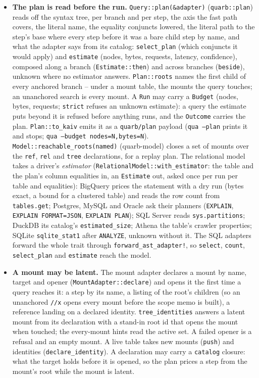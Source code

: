 \documentclass{report}
\begin{document}
\begin{itemize}
\item \textbf{The plan is read before the run.}
  \texttt{Query::plan(\&adapter)} (\texttt{quarb::plan}) reads
  off the syntax tree, per branch and per step, the axis the fast
  path covers, the literal name, the equality conjuncts lowered,
  the literal path to the step's base where every step before it
  was a bare child step by name, and what the adapter says from its
  catalog: \texttt{select\_plan} (which conjuncts it would apply)
  and \texttt{estimate} (nodes, bytes, requests, latency,
  confidence), composed along a branch (\texttt{Estimate::then})
  and across branches (\texttt{beside}), unknown where no
  estimator answers. \texttt{Plan::roots} names the first child of
  every anchored branch -- under a mount table, the mounts the
  query touches; an unanchored search is every mount. A
  \texttt{Run} may carry a \texttt{Budget} (nodes, bytes,
  requests; \texttt{strict} refuses an unknown estimate): a query
  the estimate puts beyond it is refused before anything runs, and
  the \texttt{Outcome} carries the plan. \texttt{Plan::to\_kaiv}
  emits it as a \texttt{quarb/plan} payload (\texttt{qua --plan}
  prints it and stops; \texttt{qua --budget nodes=N,bytes=N}).
  \texttt{Model::reachable\_roots(named)} (quarb-model) closes a
  set of mounts over the \texttt{ref}, \texttt{rel} and
  \texttt{tree} declarations, for a replay plan. The relational
  model takes a driver's \emph{estimator}
  (\texttt{RelationalModel::with\_estimator}: the table and the
  plan's column equalities in, an \texttt{Estimate} out, asked
  once per run per table and equalities): BigQuery prices the
  statement with a dry run (bytes exact, a bound for a clustered
  table) and reads the row count from \texttt{tables.get};
  Postgres, MySQL and Oracle ask their planners
  (\texttt{EXPLAIN}, \texttt{EXPLAIN FORMAT=JSON}, \texttt{EXPLAIN
  PLAN}); SQL Server reads \texttt{sys.partitions}; DuckDB its
  catalog's \texttt{estimated\_size}; Athena the table's
  crawler properties; SQLite \texttt{sqlite\_stat1} after
  \texttt{ANALYZE}, unknown without it. The SQL adapters forward
  the whole trait through \texttt{forward\_ast\_adapter!}, so
  \texttt{select}, \texttt{count}, \texttt{select\_plan} and
  \texttt{estimate} reach the model.

\item \textbf{A mount may be latent.} The mount adapter declares a
  mount by name, target and opener (\texttt{MountAdapter::declare})
  and opens it the first time a query reaches it: a step by its
  name, a listing of the root's children (so an unanchored
  \texttt{//x} opens every mount before the scope memo is built),
  a reference landing on a declared identity. \texttt{tree\_identities}
  answers a latent mount from its declaration with a stand-in root
  id that opens the mount when touched; the every-mount hints read
  the active set. A failed opener is a refusal and an empty mount.
  A live table takes new mounts (\texttt{push}) and identities
  (\texttt{declare\_identity}). A declaration may carry a
  \texttt{catalog} closure: what the target holds before it is
  opened, so the plan prices a step from the mount's root while
  the mount is latent.


\end{itemize}
\end{document}
